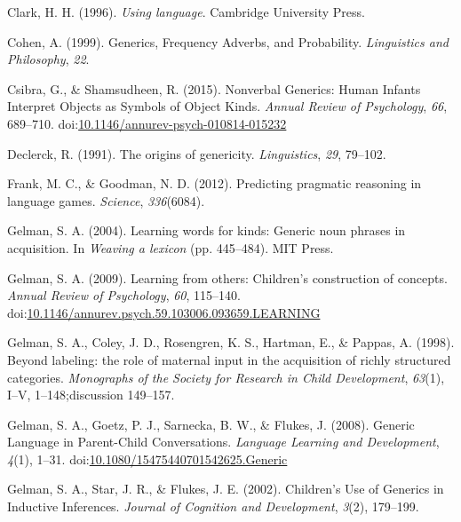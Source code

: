 \documentclass[floatsintext,doc]{apa6}
\begin{document}
\leavevmode\hypertarget{ref-Clark1996}{}%
Clark, H. H. (1996). \emph{Using language}. Cambridge University Press.

\leavevmode\hypertarget{ref-Cohen1999}{}%
Cohen, A. (1999). Generics, Frequency Adverbs, and Probability. \emph{Linguistics and Philosophy}, \emph{22}.

\leavevmode\hypertarget{ref-Csibra2015}{}%
Csibra, G., \& Shamsudheen, R. (2015). Nonverbal Generics: Human Infants Interpret Objects as Symbols of Object Kinds. \emph{Annual Review of Psychology}, \emph{66}, 689--710. doi:\href{https://doi.org/10.1146/annurev-psych-010814-015232}{10.1146/annurev-psych-010814-015232}

\leavevmode\hypertarget{ref-Declerck1991}{}%
Declerck, R. (1991). The origins of genericity. \emph{Linguistics}, \emph{29}, 79--102.

\leavevmode\hypertarget{ref-Frank2012}{}%
Frank, M. C., \& Goodman, N. D. (2012). Predicting pragmatic reasoning in language games. \emph{Science}, \emph{336}(6084).

\leavevmode\hypertarget{ref-Gelman2004}{}%
Gelman, S. A. (2004). Learning words for kinds: Generic noun phrases in acquisition. In \emph{Weaving a lexicon} (pp. 445--484). MIT Press.

\leavevmode\hypertarget{ref-Gelman2009}{}%
Gelman, S. A. (2009). Learning from others: Children's construction of concepts. \emph{Annual Review of Psychology}, \emph{60}, 115--140. doi:\href{https://doi.org/10.1146/annurev.psych.59.103006.093659.LEARNING}{10.1146/annurev.psych.59.103006.093659.LEARNING}

\leavevmode\hypertarget{ref-Gelman1998}{}%
Gelman, S. A., Coley, J. D., Rosengren, K. S., Hartman, E., \& Pappas, A. (1998). Beyond labeling: the role of maternal input in the acquisition of richly structured categories. \emph{Monographs of the Society for Research in Child Development}, \emph{63}(1), I--V, 1--148;discussion 149--157.

\leavevmode\hypertarget{ref-Gelman2008}{}%
Gelman, S. A., Goetz, P. J., Sarnecka, B. W., \& Flukes, J. (2008). Generic Language in Parent-Child Conversations. \emph{Language Learning and Development}, \emph{4}(1), 1--31. doi:\href{https://doi.org/10.1080/15475440701542625.Generic}{10.1080/15475440701542625.Generic}

\leavevmode\hypertarget{ref-Gelman2002}{}%
Gelman, S. A., Star, J. R., \& Flukes, J. E. (2002). Children's Use of Generics in Inductive Inferences. \emph{Journal of Cognition and Development}, \emph{3}(2), 179--199.
\end{document}
